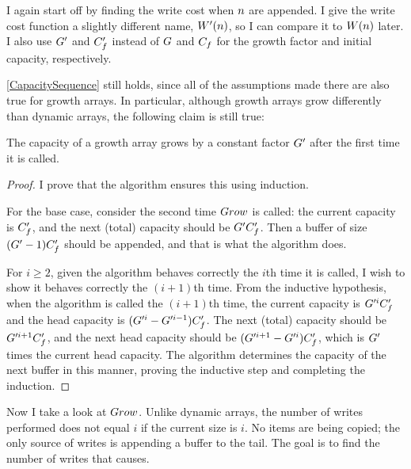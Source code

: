 \groarrayimpl

\HdrTimeComplex

I again start off by finding the write cost when $n$ are appended. I give the write cost function a slightly different name, $W'(n)$, so I can compare it to $W(n)$ later. I also use $G'$ and $C_f'$ instead of $G$ and $C_f$ for the growth factor and initial capacity, respectively.

\ref{CapacitySequence} still holds, since all of the assumptions made there are also true for growth arrays. In particular, although growth arrays grow differently than dynamic arrays, the following claim is still true:

\begin{lemma}
	The capacity of a growth array grows by a constant factor $G'$ after the first time it is called.
\end{lemma}

\begin{proof}
	I prove that the algorithm ensures this using induction.
	
	For the base case, consider the second time $Grow$ is called: the current capacity is $C_f'$, and the next (total) capacity should be $G'C_f'$. Then a buffer of size $(G' - 1)C_f'$ should be appended, and that is what the algorithm does.
	
	For $i \geq 2$, given the algorithm behaves correctly the $i$th time it is called, I wish to show it behaves correctly the $(i + 1)$th time. From the inductive hypothesis, when the algorithm is called the $(i + 1)$th time, the current capacity is $G'^iC_f'$ and the head capacity is $(G'^i - G'^{i - 1})C_f'$. The next (total) capacity should be $G'^{i + 1}C_f'$, and the next head capacity should be $(G'^{i + 1} - G'^i)C_f'$, which is $G'$ times the current head capacity. The algorithm determines the capacity of the next buffer in this manner, proving the inductive step and completing the induction.
\end{proof}

Now I take a look at $Grow$. Unlike dynamic arrays, the number of writes performed does not equal $i$ if the current size is $i$. No items are being copied; the only source of writes is appending a buffer to the tail. The goal is to find the number of writes that causes.

